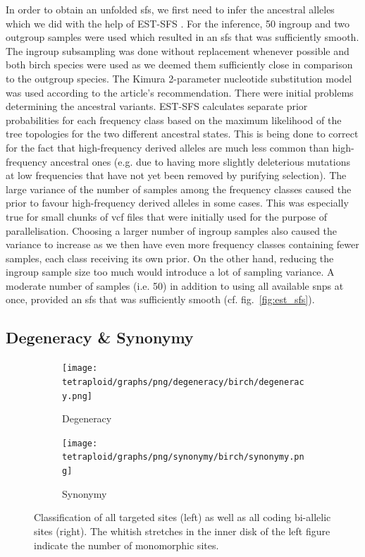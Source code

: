 \documentclass[hidelinks,11pt]{article}
\begin{document}
{    In order to obtain an unfolded \acrshort{sfs}, we first need to infer the ancestral alleles which we did with the help of EST-SFS \cite{est-sfs}. For the inference, 50 ingroup and two outgroup samples were used which resulted in an \acrshort{sfs} that was sufficiently smooth. The ingroup subsampling was done without replacement whenever possible and both birch species were used as we deemed them sufficiently close in comparison to the outgroup species. The Kimura 2-parameter nucleotide substitution model was used according to the article's recommendation. There were initial problems determining the ancestral variants. EST-SFS calculates separate prior probabilities for each frequency class based on the maximum likelihood of the tree topologies for the two different ancestral states. This is being done to correct for the fact that high-frequency derived alleles are much less common than high-frequency ancestral ones (e.g. due to having more slightly deleterious mutations at low frequencies that have not yet been removed by purifying selection). The large variance of the number of samples among the frequency classes caused the prior to favour high-frequency derived alleles in some cases. This was especially true for small chunks of \acrshort{vcf} files that were initially used for the purpose of parallelisation. Choosing a larger number of ingroup samples also caused the variance to increase as we then have even more frequency classes containing fewer samples, each class receiving its own prior. On the other hand, reducing the ingroup sample size too much would introduce a lot of sampling variance. A moderate number of samples (i.e. 50) in addition to using all available \acrshort{snp}s at once, provided an \acrshort{sfs} that was sufficiently smooth (cf. fig.~\ref{fig:est_sfs}).

    \subsection{Degeneracy \& Synonymy}
    \label{sec:degeneracy-synonymy}

    \begin{figure}[ht]
        \centering
        \begin{subfigure}[b]{0.46\textwidth}
            \centering
            \texttt{[image: tetraploid/graphs/png/degeneracy/birch/degeneracy.png]}
            \caption{Degeneracy}
            \label{fig:degeneracy}
        \end{subfigure}
        \hfill
        \begin{subfigure}[b]{0.52\textwidth}
            \centering
            \texttt{[image: tetraploid/graphs/png/synonymy/birch/synonymy.png]}
            \caption{Synonymy}
            \label{fig:synonymy}
        \end{subfigure}
        \caption{Classification of all targeted sites (left) as well as all coding bi-allelic sites (right). The whitish stretches in the inner disk of the left figure indicate the number of monomorphic sites.}
        \label{fig:synonymy_degeneracy}
    \end{figure}

}
\end{document}
